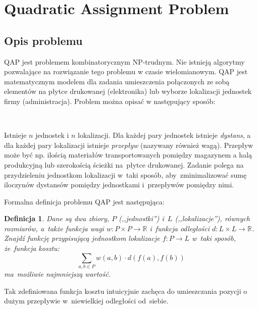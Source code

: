 \documentclass[a4paper,10pt]{article}
\newtheorem{definition}{Definicja}
\begin{document}


\section{Quadratic Assignment Problem}
\subsection{Opis problemu}
QAP jest problemem kombinatorycznym NP-trudnym. 
Nie istnieją algorytmy pozwalające na rozwiązanie tego problemu w czasie wielomianowym.
QAP jest matematycznym modelem dla zadania umieszczenia połączonych ze sobą elementów na płytce drukowanej (elektronika) lub wyborze lokalizacji jednostek firmy (administracja).
Problem można opisać w następujący sposób:

\vspace{0.2 cm}
\begin{minipage}{0.03\textwidth}
\mbox{ }
\end{minipage}
\hfill
\begin{minipage}{0.95\textwidth}
Istnieje $n$ jednostek i $n$ lokalizacji.
Dla każdej pary jednostek istnieje \emph{dystans}, a dla każdej pary lokalizacji istnieje \emph{przepływ} (nazywany również wagą).
Przepływ może być np. ilością materiałów transportowanych pomiędzy magazynem a halą produkcyjną lub szerokością ścieżki
na~płytce drukowanej.
Zadanie polega na przydzieleniu jednostkom lokalizacji w~taki sposób, aby~zminimalizować sumę iloczynów dystansów pomiędzy jednostkami
i~przepływów pomiędzy nimi.
\end{minipage}
\vspace{0.2 cm}

Formalna definicja problemu QAP jest następująca:
\begin{definition}
Dane są dwa zbiory, $P$ (,,jednostki'') i~$L$ (,,lokalizacje''), równych rozmiarów, a~także funkcja wagi 
$w: P \times P \rightarrow \mathbb{R}$ i~funkcja odległości $d: L \times L \rightarrow \mathbb{R}$.
Znajdź funkcję przypisującą jednostkom lokalizacje $f: P \rightarrow L$ w~taki sposób, że~funkcja kosztu:
\begin{equation}
\sum_{a,b\in P}w(a,b) \cdot d(f(a),f(b))
\label{eq:qap_cost}
\end{equation}
ma~możliwie najmniejszą wartość.
\end{definition}

Tak zdefiniowana funkcja kosztu intuicyjnie zachęca do umieszczania pozycji o dużym przepływie w~niewielkiej odległości od~siebie.
\end{document}
